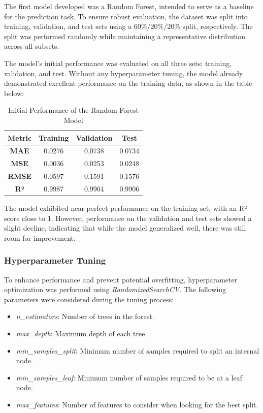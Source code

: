 The first model developed was a Random Forest, intended to serve as a baseline for the prediction task. To ensure robust evaluation, the dataset was split into training, validation, and test sets using a 60\%/20\%/20\% split, respectively. The split was performed randomly while maintaining a representative distribution across all subsets.

The model's initial performance was evaluated on all three sets: training, validation, and test. Without any hyperparameter tuning, the model already demonstrated excellent performance on the training data, as shown in the table below:

\begin{table}[H]
\centering
\caption{Initial Performance of the Random Forest Model}
\begin{tabular}{||c|c|c|c||}
\hline
\textbf{Metric} & \textbf{Training} & \textbf{Validation} & \textbf{Test} \\
\hline
\textbf{MAE} & 0.0276 & 0.0738 & 0.0734 \\
\hline
\textbf{MSE} & 0.0036 & 0.0253 & 0.0248 \\
\hline
\textbf{RMSE} & 0.0597 & 0.1591 & 0.1576 \\
\hline
\textbf{R²} & 0.9987 & 0.9904 & 0.9906 \\
\hline
\end{tabular}
\label{tab:rf_initial_performance}
\end{table}

The model exhibited near-perfect performance on the training set, with an R² score close to 1. However, performance on the validation and test sets showed a slight decline, indicating that while the model generalized well, there was still room for improvement.

\subsubsection{Hyperparameter Tuning}

To enhance performance and prevent potential overfitting, hyperparameter optimization was performed using \textit{RandomizedSearchCV}. The following parameters were considered during the tuning process:

\begin{itemize}
\item \textit{n\_estimators}: Number of trees in the forest.
\item \textit{max\_depth}: Maximum depth of each tree.
\item \textit{min\_samples\_split}: Minimum number of samples required to split an internal node.
\item \textit{min\_samples\_leaf}: Minimum number of samples required to be at a leaf node.
\item \textit{max\_features}: Number of features to consider when looking for the best split.
\end{itemize}

